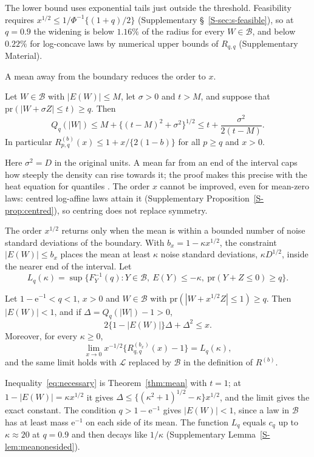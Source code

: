 \documentclass[lineno]{biometrika}
\newcommand{\pr}{\mathrm{pr}}
\newcommand{\LC}{\mathcal{L}}
\begin{document}
The lower bound uses exponential tails just outside the threshold. Feasibility requires $x^{1/2} \le 1/\Phi^{-1}\{(1+q)/2\}$ (Supplementary \S~\ref{S-sec:s-feasible}), so at $q = 0.9$ the widening is below $1.16\%$ of the radius for every $W \in \mathcal B$, and below $0.22\%$ for log-concave laws by numerical upper bounds of $R_{q,q}$ (Supplementary Material).

A mean away from the boundary reduces the order to $x$.

\begin{theorem}\label{thm:mean}
Let $W \in \mathcal B$ with $|E(W)| \le M$, let $\sigma > 0$ and $t > M$, and suppose that $\pr(|W + \sigma Z| \le t) \ge q$. Then
\[
Q_q(|W|) \le M + \{(t - M)^2 + \sigma^2\}^{1/2} \le t + \frac{\sigma^2}{2(t - M)}.
\]
In particular $R^{(b)}_{p,q}(x) \le 1 + x/\{2(1 - b)\}$ for all $p \ge q$ and $x > 0$.
\end{theorem}

Here $\sigma^2 = D$ in the original units. A mean far from an end of the interval caps how steeply the density can rise towards it; the proof makes this precise with the heat equation for quantiles \citep{steinbrecher2008}. The order $x$ cannot be improved, even for mean-zero laws: centred log-affine laws attain it (Supplementary Proposition~\ref{S-prop:centred}), so centring does not replace symmetry.

The order $x^{1/2}$ returns only when the mean is within a bounded number of noise standard deviations of the boundary. With $b_x = 1 - \kappa x^{1/2}$, the constraint $|E(W)| \le b_x$ places the mean at least $\kappa$ noise standard deviations, $\kappa D^{1/2}$, inside the nearer end of the interval. Let
\[
L_q(\kappa) = \sup\{F_Y^{-1}(q) : Y \in \mathcal B,\ E(Y) \le -\kappa,\ \pr(Y + Z \le 0) \ge q\}.
\]

\begin{theorem}\label{thm:transition}
Let $1 - \mathrm{e}^{-1} < q < 1$, $x > 0$ and $W \in \mathcal B$ with $\pr(|W + x^{1/2}Z| \le 1) \ge q$. Then $|E(W)| < 1$, and if $\Delta = Q_q(|W|) - 1 > 0$,
\begin{equation}\label{eq:necessary}
2\{1 - |E(W)|\}\Delta + \Delta^2 \le x .
\end{equation}
Moreover, for every $\kappa \ge 0$,
\[
\lim_{x \to 0} x^{-1/2}\{R^{(b_x)}_{q,q}(x) - 1\} = L_q(\kappa),
\]
and the same limit holds with $\LC$ replaced by $\mathcal B$ in the definition of $R^{(b)}$.
\end{theorem}

Inequality~\eqref{eq:necessary} is Theorem~\ref{thm:mean} with $t = 1$; at $1 - |E(W)| = \kappa x^{1/2}$ it gives $\Delta \le \{(\kappa^2 + 1)^{1/2} - \kappa\}x^{1/2}$, and the limit gives the exact constant. The condition $q > 1 - \mathrm{e}^{-1}$ gives $|E(W)| < 1$, since a law in $\mathcal B$ has at least mass $\mathrm{e}^{-1}$ on each side of its mean. The function $L_q$ equals $c_q$ up to $\kappa \approx 20$ at $q = 0.9$ and then decays like $1/\kappa$ (Supplementary Lemma~\ref{S-lem:meanonesided}).
\end{document}
